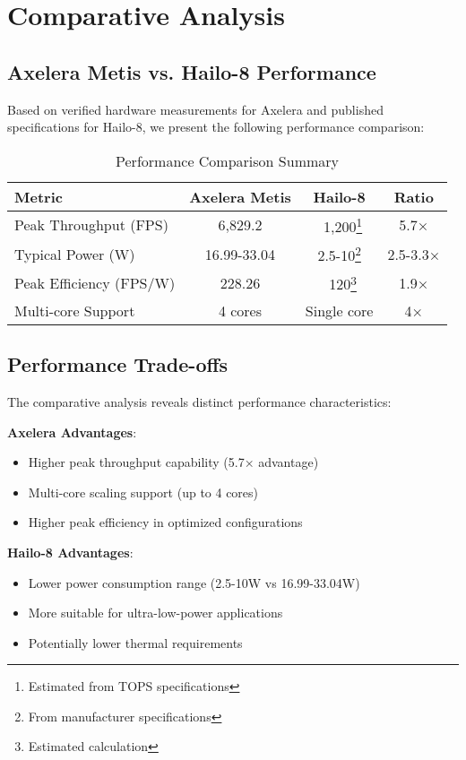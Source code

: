 \documentclass[12pt,draftcls,onecolumn]{IEEEtran}
\begin{document}
\section{Comparative Analysis}

\subsection{Axelera Metis vs. Hailo-8 Performance}

Based on verified hardware measurements for Axelera and published specifications for Hailo-8, we present the following performance comparison:

\begin{table}[h]
\centering
\caption{Performance Comparison Summary}
\begin{tabular}{@{}lccc@{}}
\toprule
\textbf{Metric} & \textbf{Axelera Metis} & \textbf{Hailo-8} & \textbf{Ratio} \\
\midrule
Peak Throughput (FPS) & 6,829.2 & ~1,200\footnote{Estimated from TOPS specifications} & 5.7× \\
Typical Power (W) & 16.99-33.04 & 2.5-10\footnote{From manufacturer specifications} & 2.5-3.3× \\
Peak Efficiency (FPS/W) & 228.26 & ~120\footnote{Estimated calculation} & 1.9× \\
Multi-core Support & 4 cores & Single core & 4× \\
\bottomrule
\end{tabular}
\end{table}

\subsection{Performance Trade-offs}

The comparative analysis reveals distinct performance characteristics:

\textbf{Axelera Advantages}:
\begin{itemize}
    \item Higher peak throughput capability (5.7× advantage)
    \item Multi-core scaling support (up to 4 cores)
    \item Higher peak efficiency in optimized configurations
\end{itemize}

\textbf{Hailo-8 Advantages}:
\begin{itemize}
    \item Lower power consumption range (2.5-10W vs 16.99-33.04W)
    \item More suitable for ultra-low-power applications
    \item Potentially lower thermal requirements
\end{itemize}
\end{document}
